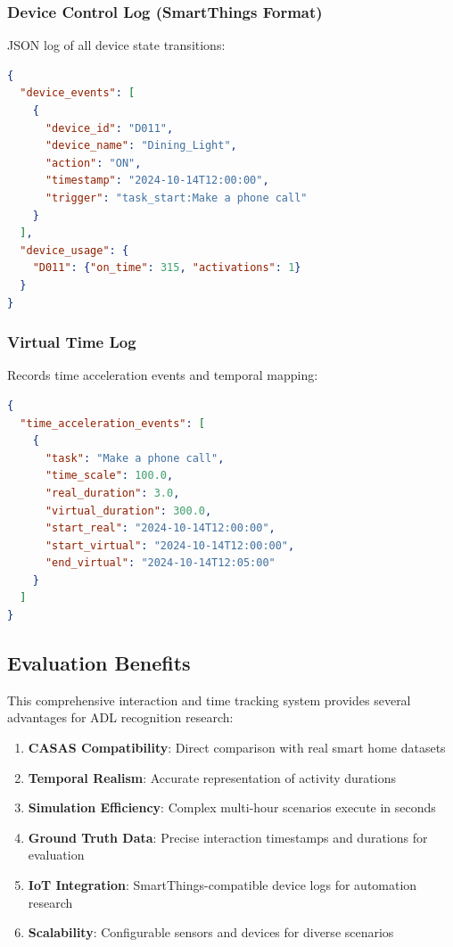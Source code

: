 \documentclass[conference]{IEEEtran}
\begin{document}
\subsubsection{Device Control Log (SmartThings Format)}
JSON log of all device state transitions:
\begin{lstlisting}[language=json,basicstyle=\ttfamily\scriptsize]
{
  "device_events": [
    {
      "device_id": "D011",
      "device_name": "Dining_Light",
      "action": "ON",
      "timestamp": "2024-10-14T12:00:00",
      "trigger": "task_start:Make a phone call"
    }
  ],
  "device_usage": {
    "D011": {"on_time": 315, "activations": 1}
  }
}
\end{lstlisting}

\subsubsection{Virtual Time Log}
Records time acceleration events and temporal mapping:
\begin{lstlisting}[language=json,basicstyle=\ttfamily\scriptsize]
{
  "time_acceleration_events": [
    {
      "task": "Make a phone call",
      "time_scale": 100.0,
      "real_duration": 3.0,
      "virtual_duration": 300.0,
      "start_real": "2024-10-14T12:00:00",
      "start_virtual": "2024-10-14T12:00:00",
      "end_virtual": "2024-10-14T12:05:00"
    }
  ]
}
\end{lstlisting}

\subsection{Evaluation Benefits}

This comprehensive interaction and time tracking system provides several advantages for ADL recognition research:

\begin{enumerate}
    \item \textbf{CASAS Compatibility}: Direct comparison with real smart home datasets
    \item \textbf{Temporal Realism}: Accurate representation of activity durations
    \item \textbf{Simulation Efficiency}: Complex multi-hour scenarios execute in seconds
    \item \textbf{Ground Truth Data}: Precise interaction timestamps and durations for evaluation
    \item \textbf{IoT Integration}: SmartThings-compatible device logs for automation research
    \item \textbf{Scalability}: Configurable sensors and devices for diverse scenarios
\end{enumerate}
\end{document}
